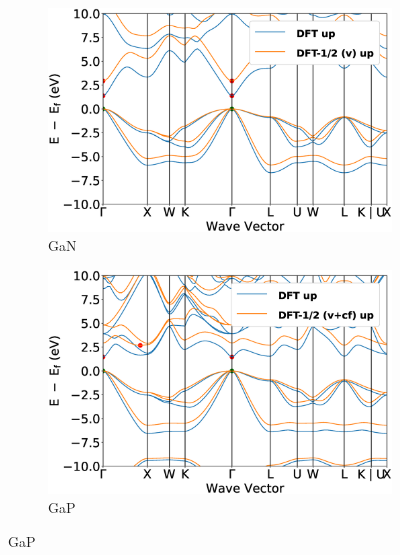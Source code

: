 \begin{figure}[!ht]
\medskip

\begin{subfigure}{0.45\textwidth}
  \includegraphics[width=\linewidth]{images/band_3d_GaN.eps}
  \caption{GaN}
\end{subfigure}\hfil %
\begin{subfigure}{0.45\textwidth}
  \includegraphics[width=\linewidth]{images/band_3d_GaP.eps}
  \caption{GaP}
\end{subfigure}\hfil %

\medskip


\end{figure}
